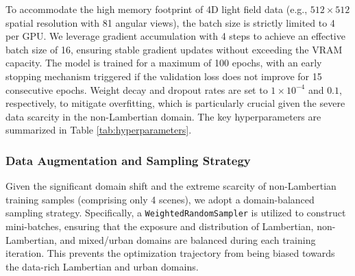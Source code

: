 \documentclass[lettersize,journal]{IEEEtran}
\begin{document}
To accommodate the high memory footprint of 4D light field data (e.g., $512 \times 512$ spatial resolution with 81 angular views), the batch size is strictly limited to 4 per GPU. We leverage gradient accumulation with 4 steps to achieve an effective batch size of 16, ensuring stable gradient updates without exceeding the VRAM capacity. The model is trained for a maximum of 100 epochs, with an early stopping mechanism triggered if the validation loss does not improve for 15 consecutive epochs. Weight decay and dropout rates are set to $1 \times 10^{-4}$ and $0.1$, respectively, to mitigate overfitting, which is particularly crucial given the severe data scarcity in the non-Lambertian domain. The key hyperparameters are summarized in Table \ref{tab:hyperparameters}.

\begin{table}[!t]
\caption{Summary of Key Training Hyperparameters}\label{tab:hyperparameters}
\centering\small
{}
\end{table}

\subsubsection{Data Augmentation and Sampling Strategy}
Given the significant domain shift and the extreme scarcity of non-Lambertian training samples (comprising only 4 scenes), we adopt a domain-balanced sampling strategy. Specifically, a \texttt{WeightedRandomSampler} is utilized to construct mini-batches, ensuring that the exposure and distribution of Lambertian, non-Lambertian, and mixed/urban domains are balanced during each training iteration. This prevents the optimization trajectory from being biased towards the data-rich Lambertian and urban domains.
\end{document}
